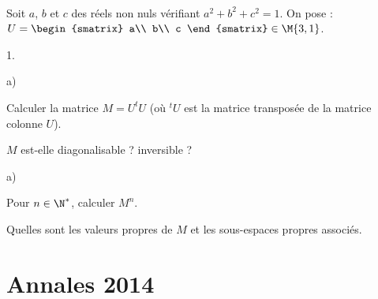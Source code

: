 \documentclass[11pt]{article}%
\begin{document}
\begin{exerciceSP}~\\
  Soit $a$, $b$ et $c$ des réels non nuls vérifiant
  $a^2+b^2+c^2 = 1$. On pose : $U = 
  \begin{smatrix} 
    a\\ 
    b\\
    c
  \end{smatrix} \in \M{3,1}$.
  \begin{noliste}{1.}
    \setlength{\itemsep}{2mm}
  \item 
    \begin{noliste}{a)}
    \setlength{\itemsep}{2mm}
    \item Calculer la matrice $M=U ^t U$ (où $^t U$ est la matrice
      transposée de la matrice colonne $U$).
    \item $M$ est-elle diagonalisable ? inversible ?
    \end{noliste}
  \item
    \begin{noliste}{a)}
    \setlength{\itemsep}{2mm}
    \item Pour $n\in\N^*$, calculer $M^n$.
    \item Quelles sont les valeurs propres de $M$ et les sous-espaces
      propres associés.
    \end{noliste}
  \end{noliste}
\end{exerciceSP}


\newpage


\section{Annales 2014}

\end{document}
